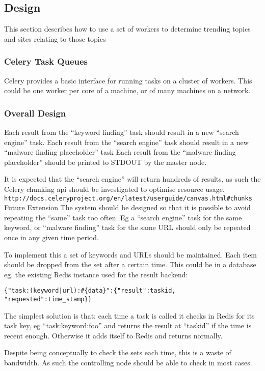 \subsection{Design}
This section describes how to use a set of workers to determine trending topics and sites relating to those topics


\subsubsection{Celery Task Queues}
Celery provides a basic interface for running tasks on a cluster of workers. This could be one worker per core of a machine, or of many machines on a network.

\subsubsection{Overall Design}
Each result from the ``keyword finding'' task should result in a new ``search engine'' task.
Each result from the ``search engine'' task should result in a new ``malware finding placeholder'' task
Each result from the ``malware finding placeholder'' should be printed to STDOUT by the master node.

It is expected that the ``search engine'' will return hundreds of results, as such the Celery chunking api should be investigated to optimise resource usage. \verb`http://docs.celeryproject.org/en/latest/userguide/canvas.html#chunks`
Future Extension
The system should be designed so that it is possible to avoid repeating the ``same'' task too often. Eg a ``search engine'' task for the same keyword, or ``malware finding'' task for the same URL should only be repeated once in any given time period.

To implement this a set of keywords and URLs should be maintained. Each item should be dropped from the set after a certain time. This could be in a database eg. the existing Redis instance used for the result backend:

\verb/{"task:(keyword|url):#{data}":{"result":taskid, "requested":time_stamp}}/

The simplest solution is that: each time a task is called it checks in Redis for its task key, eg ``task:keyword:foo'' and returns the result at ``taskid'' if the time is recent enough. Otherwise it adds itself to Redis and returns normally.

Despite being conceptually to check the sets each time, this is a waste of bandwidth. As such the controlling node should be able to check in most cases.

